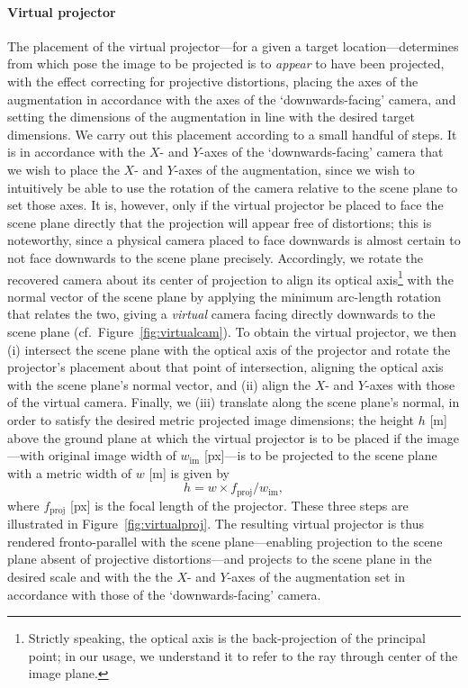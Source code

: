 \documentclass[review]{elsarticle}
\begin{document}
\paragraph{Virtual projector} The placement of the virtual projector---for a given a target location---determines from which pose the image to be projected is to \textit{appear} to have been projected, with the effect correcting for projective distortions, placing the axes of the augmentation in accordance with the axes of the `downwards-facing' camera, and setting the dimensions of the augmentation in line with the desired target dimensions.  We carry out this placement according to a small handful of steps. It is in accordance with the $X$- and $Y$-axes of the `downwards-facing' camera that we wish to place the $X$- and $Y$-axes of the augmentation, since we wish to intuitively be able to use the rotation of the camera relative to the scene plane to set those axes. It is, however, only if the virtual projector be placed to face the scene plane directly that the projection will appear free of distortions; this is noteworthy, since a physical camera placed to face downwards is almost certain to not face downwards to the scene plane precisely. Accordingly, we rotate the recovered camera about its center of projection to align its optical axis\footnote{Strictly speaking, the optical axis is the back-projection of the principal point; in our usage, we understand it to refer to the ray through center of the image plane.} with the normal vector of the scene plane by applying the minimum arc-length rotation that relates the two, giving a \textit{virtual} camera facing directly downwards to the scene plane (cf.\ Figure~\ref{fig:virtualcam}). To obtain the virtual projector, we then (i) intersect the scene plane with the optical axis of the projector and rotate the projector's placement about that point of intersection, aligning the optical axis with the scene plane's normal vector, and (ii) align the $X$- and $Y$-axes with those of the virtual camera. Finally, we (iii) translate along the scene plane's normal, in order to satisfy the desired metric projected image dimensions; the height $h$ [m] above the ground plane at which the virtual projector is to be placed if the image---with original image width of $w_\text{im}$ [px]---is to be projected to the scene plane with a metric width of $w$ [m] is given by
\begin{equation}
h = w \times f_\text{proj} / w_\text{im},
\end{equation}
where $f_\text{proj}$ [px] is the focal length of the projector. These three steps are illustrated in Figure~\ref{fig:virtualproj}. The resulting virtual projector is thus rendered fronto-parallel with the scene plane---enabling projection to the scene plane absent of projective distortions---and projects to the scene plane in the desired scale and with the the $X$- and $Y$-axes of the augmentation set in accordance with those of the `downwards-facing' camera. %
\end{document}
